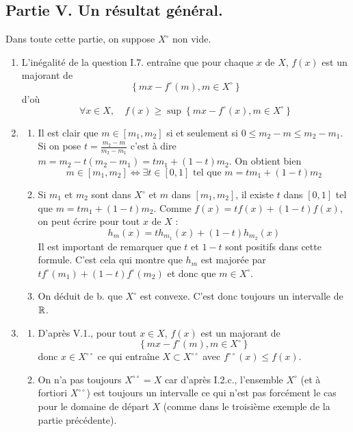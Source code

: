 \subsection*{Partie V. Un résultat général. }

Dans toute cette partie, on suppose $X^{\circ }$ non vide.

\begin{enumerate}
\item  L'in\'{e}galit\'{e} de la question I.7. entraîne que pour chaque $x$ de $X$, $f(x)$ est un majorant de
\[\left\{ mx-f^{\circ }(m),m\in X^{\circ }\right\} \]
d'o\`{u}
\[
\forall x\in X,\quad f(x)\geq \sup \left\{ mx-f^{\circ }(x),m\in X^{\circ
}\right\}
\]

\item
\begin{enumerate}
\item  Il est clair que $m\in \left[ m_{1},m_{2}\right] $ si et seulement si $0\leq m_{2}-m\leq m_{2}-m_{1}$. Si on pose $t=\frac{m_{2}-m}{m_{2}-m_{1}}$ c'est \`{a} dire $m=m_{2}-t(m_{2}-m_{1})=tm_{1}+(1-t)m_{2}.$ On obtient bien
\[
m\in \left[ m_{1},m_{2}\right] \Leftrightarrow \exists t\in \left[
0,1\right] \text{ tel que }m=tm_{1}+(1-t)m_{2}
\]

\item  Si $m_{1}$ et $m_{2}$ sont dans $X^{\circ }$ et $m$ dans $\left[m_{1},m_{2}\right]$, il existe $t$ dans $\left[ 0,1\right] $ tel que $m=tm_{1}+(1-t)m_{2}$. Comme $f(x)=tf(x)+(1-t)f(x)$, on peut \'{e}crire pour
tout $x$ de $X$ :
\[
h_{m}(x)=th_{m_{1}}(x)+(1-t)h_{m_{2}}(x)
\]
Il est important de remarquer que $t$ et $1-t$ sont positifs dans cette formule. C'est cela qui montre que $h_{m}$ est major\'{e}e par $tf^{\circ}(m_{1})+(1-t)f^{\circ }(m_{2})$ et donc que $m\in X^{\circ }$.

\item  On d\'{e}duit de b. que $X^{\circ }$ est convexe. C'est donc toujours un intervalle de $\mathbb{R}$.
\end{enumerate}

\item  \begin{enumerate}
\item D'apr\`{e}s V.1., pour tout $x\in X$, $f(x)$ est un majorant de
\[
\left\{ mx-f^{\circ }(m),m\in X^{\circ }\right\} \]
 donc $x\in X^{\circ \circ
}$ ce qui entra\^{i}ne $X\subset X^{\circ \circ }$ avec $f^{\circ \circ }(x)\leq f(x)$.

\item  On n'a pas toujours $X^{\circ \circ }=X$ car d'apr\`{e}s I.2.c., l'ensemble $X^{\circ }$ (et \`{a} fortiori $X^{\circ \circ }$) est toujours un intervalle ce qui n'est pas forc\'{e}ment le cas pour le domaine de d\'{e}part $X$ (comme dans le troisi\`{e}me exemple de la partie pr\'{e}c\'{e}dente).


\end{enumerate}
\end{enumerate}
